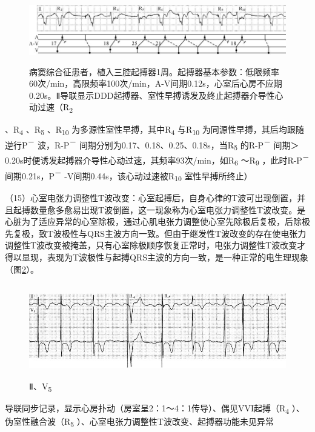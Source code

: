 \begin{figure}[!htbp]
 \centering
 \includegraphics[width=5.80208in,height=1.13542in]{./images/Image00615.jpg}
 \captionsetup{justification=centering}
 \caption{病窦综合征患者，植入三腔起搏器1周。起搏器基本参数：低限频率60次/min，高限频率100次/min，A-V间期0.12s，心室后心房不应期0.20s。Ⅱ导联显示DDD起搏器、室性早搏诱发及终止起搏器介导性心动过速（R\textsubscript{2}}
 \label{fig38-12}
  \end{figure} 
、R\textsubscript{4} 、R\textsubscript{5} 、R\textsubscript{10}
为多源性室性早搏，其中R\textsubscript{4} 与R\textsubscript{10}
为同源性早搏，其后均跟随逆行P\textsuperscript{－}
波，R-P\textsuperscript{－}
间期分别为0.17、0.18、0.25、0.18s，当R\textsubscript{5}
的R-P\textsuperscript{－}
间期＞0.20s时便诱发起搏器介导性心动过速，其频率93次/min，如R\textsubscript{6}
～R\textsubscript{9} ，此时R-P\textsuperscript{－}
间期0.21s，P\textsuperscript{－}
-V间期0.44s，该心动过速被R\textsubscript{10} 室性早搏所终止）

（15）心室电张力调整性T波改变：心室起搏后，自身心律的T波可出现倒置，并且起搏数量愈多愈易出现T波倒置，这一现象称为心室电张力调整性T波改变。是心脏为了适应异常的心室除极，通过心肌电张力调整使心室先除极后复极，后除极先复极，致T波极性与QRS主波方向一致。但由于继发性T波改变的存在使电张力调整性T波改变被掩盖，只有心室除极顺序恢复正常时，电张力调整性T波改变才得以显现，表现为T波极性与起搏QRS主波的方向一致，是一种正常的电生理现象（图\ref{fig38-13}）。

\begin{figure}[!htbp]
 \centering
 \includegraphics[width=5.58333in,height=1.61458in]{./images/Image00616.jpg}
 \captionsetup{justification=centering}
 \caption{Ⅱ、V\textsubscript{5}}
 \label{fig38-13}
  \end{figure} 
导联同步记录，显示心房扑动（房室呈2：1～4：1传导）、偶见VVI起搏（R\textsubscript{4}
）、伪室性融合波（R\textsubscript{5}
）、心室电张力调整性T波改变、起搏器功能未见异常

